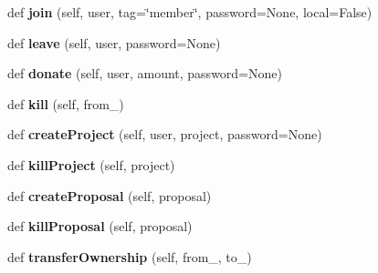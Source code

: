\begin{DoxyCompactItemize}
def {\bfseries join} (self, user, tag=\char`\"{}member\char`\"{}, password=None, local=False)
\item 
\mbox{\label{classapp_1_1models_1_1organization_1_1_orga_document_ab1fc3d2427a46e1185f52e6f4356050e}} 
def {\bfseries leave} (self, user, password=None)
\item 
\mbox{\label{classapp_1_1models_1_1organization_1_1_orga_document_accc20f8c54cdadb1d44590b4f03060f8}} 
def {\bfseries donate} (self, user, amount, password=None)
\item 
\mbox{\label{classapp_1_1models_1_1organization_1_1_orga_document_ad17c57864e902bdf13fa9ec1cdcff2e9}} 
def {\bfseries kill} (self, from\+\_\+)
\item 
\mbox{\label{classapp_1_1models_1_1organization_1_1_orga_document_ae81cedfb29256cbd41b68f3a3772d34f}} 
def {\bfseries create\+Project} (self, user, project, password=None)
\item 
\mbox{\label{classapp_1_1models_1_1organization_1_1_orga_document_ac33adf8338535ad748de0c0ddcce6ef7}} 
def {\bfseries kill\+Project} (self, project)
\item 
\mbox{\label{classapp_1_1models_1_1organization_1_1_orga_document_a52061ca265673820966d3f159f6faf1b}} 
def {\bfseries create\+Proposal} (self, proposal)
\item 
\mbox{\label{classapp_1_1models_1_1organization_1_1_orga_document_a58deda109d3c1c3d5e8b52c36429f640}} 
def {\bfseries kill\+Proposal} (self, proposal)
\item 
\mbox{\label{classapp_1_1models_1_1organization_1_1_orga_document_aea90ef8b9f4925bf47e2ec29e56b64ab}} 
def {\bfseries transfer\+Ownership} (self, from\+\_\+, to\+\_\+)
\end{DoxyCompactItemize}
